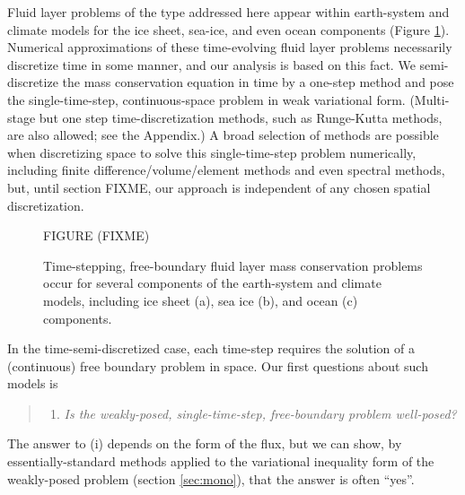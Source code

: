 \documentclass[final,leqno,onefignum,onetabnum]{siamltex1213bueler}
\begin{document}
Fluid layer problems of the type addressed here appear within earth-system and climate models for the ice sheet, sea-ice, and even ocean components (Figure \ref{fig:climatepictures}).  Numerical approximations of these time-evolving fluid layer problems necessarily discretize time in some manner, and our analysis is based on this fact.  We semi-discretize the mass conservation equation in time by a one-step method and pose the single-time-step, continuous-space problem in weak variational form.  (Multi-stage but one step time-discretization methods, such as Runge-Kutta methods, are also allowed; see the Appendix.)  A broad selection of methods are possible when discretizing space to solve this single-time-step problem numerically, including finite difference/volume/element methods and even spectral methods, but, until section FIXME, our approach is independent of any chosen spatial discretization.

\begin{figure}[ht]
\begin{center}
FIGURE (FIXME)
\end{center}
\caption{Time-stepping, free-boundary fluid layer mass conservation problems occur for several components of the earth-system and climate models, including ice sheet (a), sea ice (b), and ocean (c) components.}
\label{fig:climatepictures}
\end{figure}

In the time-semi-discretized case, each time-step requires the solution of a (continuous) free boundary problem in space.  Our first questions about such models is
  \begin{quote}
  \renewcommand{\labelenumi}{(\roman{enumi})}
  \begin{enumerate}
  \item \emph{Is the weakly-posed, single-time-step, free-boundary problem well-posed?}
  \end{enumerate}
  \end{quote}
The answer to (i) depends on the form of the flux, but we can show, by essentially-standard methods applied to the variational inequality form of the weakly-posed problem (section \ref{sec:mono}), that the answer is often ``yes''.
\end{document}
